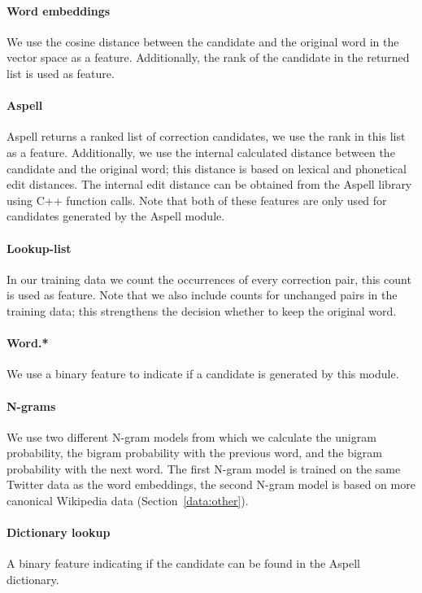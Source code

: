\documentclass[a4paper,10pt,twoside]{article}
\begin{document}
\paragraph{Word embeddings}
We use the cosine distance between the candidate and the original word in the
vector space as a feature. Additionally, the rank of the candidate in
the returned list is used as feature.  

\paragraph{Aspell}
Aspell returns a ranked list of correction candidates, we use the rank in this
list as a feature. Additionally, we use the internal calculated distance
between the candidate and the original word; this distance is based on lexical
and phonetical edit distances. The internal edit distance can be obtained from
the Aspell library using C++ function calls. Note that both of these features are
only used for candidates generated by the Aspell module.

\paragraph{Lookup-list}
In our training data we count the occurrences of every correction pair, this
count is used as feature. Note that we also include counts for unchanged pairs
in the training data; this strengthens the decision whether to keep the
original word.

\paragraph{Word.*}
We use a binary feature to indicate if a candidate is generated by this module.

\paragraph{N-grams}
We use two different N-gram models from which we calculate the unigram
probability, the bigram probability with the previous word, and the bigram
probability with the next word. The first N-gram model is trained on the same
Twitter data as the word embeddings, the second N-gram model is based on more
canonical Wikipedia data (Section~\ref{data:other}).

\paragraph{Dictionary lookup}
A binary feature indicating if the candidate can be found in the Aspell
dictionary.
\end{document}
